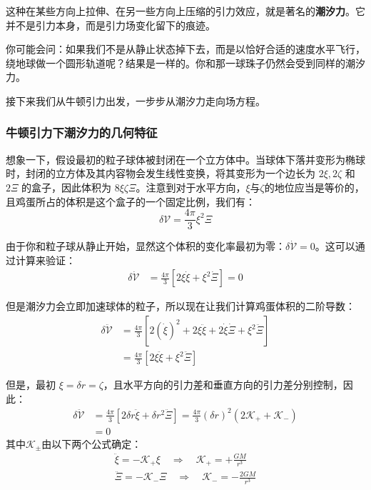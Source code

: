 \documentclass{article}
\begin{document}
这种在某些方向上拉伸、在另一些方向上压缩的引力效应，就是著名的\textbf{潮汐力}。它并不是引力本身，而是引力场变化留下的痕迹。

你可能会问：如果我们不是从静止状态掉下去，而是以恰好合适的速度水平飞行，绕地球做一个圆形轨道呢？结果是一样的。你和那一球珠子仍然会受到同样的潮汐力。

接下来我们从牛顿引力出发，一步步从潮汐力走向场方程。

\subsubsection{牛顿引力下潮汐力的几何特征}

想象一下，假设最初的粒子球体被封闭在一个立方体中。当球体下落并变形为椭球时，封闭的立方体及其内容物会发生线性变换，将其变形为一个边长为 $2\xi, 2\zeta$ 和 $2\Xi$ 的盒子，因此体积为 $8\xi\zeta\Xi$。注意到对于水平方向，$\xi$与$\zeta$的地位应当是等价的，且鸡蛋所占的体积是这个盒子的一个固定比例，我们有：
\begin{equation}
\delta \mathcal{V} = \frac{4\pi}{3} \xi^2 \Xi\label{1.1.1.1}
\end{equation}

由于你和粒子球从静止开始，显然这个体积的变化率最初为零：$\delta \dot{\mathcal{V}} = 0$。这可以通过计算来验证：
\begin{align*}
\delta \dot{\mathcal{V}} &= \frac{4\pi}{3} \left[ 2\xi \dot{\xi} + \xi^2 \dot{\Xi} \right] = 0
\end{align*}

但是潮汐力会立即加速球体的粒子，所以现在让我们计算鸡蛋体积的二阶导数：
\begin{align*}
\delta \ddot{\mathcal{V}} &= \frac{4\pi}{3} \left[ 2(\dot{\xi})^2 + 2\xi \ddot{\xi} + 2\dot{\xi} \dot{\Xi} + \xi^2 \ddot{\Xi} \right] \\
&= \frac{4\pi}{3} \left[ 2\xi \ddot{\xi} + \xi^2 \ddot{\Xi} \right]
\end{align*}

但是，最初 $\xi = \delta r = \zeta$，且水平方向的引力差和垂直方向的引力差分别控制，因此：
\begin{align*}
\delta \ddot{\mathcal{V}} &= \frac{4\pi}{3} \left[ 2\delta r \ddot{\xi} + \delta r^2 \ddot{\Xi} \right] = \frac{4\pi}{3} (\delta r)^2 \left( 2\mathcal{K}_+ + \mathcal{K}_- \right) \\
&= {0}
\end{align*}
其中$\mathcal K_{\pm}$由以下两个公式确定：
\begin{gather*}
    \ddot{\xi} = -\mathcal{K}_+ \xi \quad \Rightarrow \quad \mathcal{K}_+ = +\frac{GM}{r^3}\\
    \ddot{\Xi} = -\mathcal{K}_- \Xi \quad \Rightarrow \quad \mathcal{K}_- = -\frac{2GM}{r^3}
\end{gather*}
\end{document}
